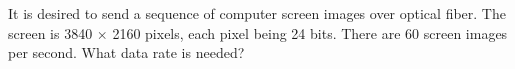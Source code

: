 
\section{}
It is desired to send a sequence of computer screen images over optical fiber. The screen is 3840 $\times$ 2160 pixels, each pixel being 24 bits. There are 60 screen images per second. What data rate is needed?


\section{}
\section{}
\section{}
\section{}
\section{}
\section{}
